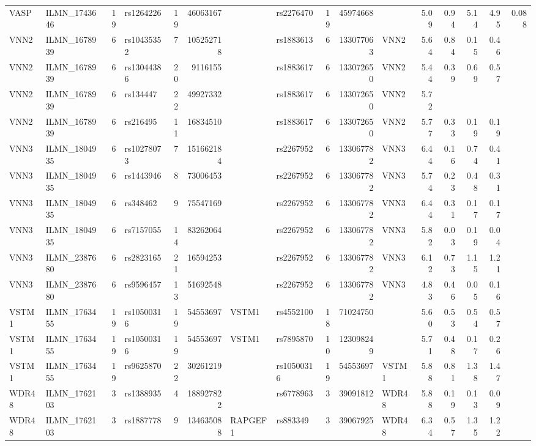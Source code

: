 \documentclass{article}
\begin{document}
\begin{landscape}
{\begin{ThreePartTable}
\begin{longtable}{|llr|lrrl|lrrl|rrrr|r|}
  VASP & ILMN\_1743646 & 19 & rs1264226 & 19 & 46063167 &  & rs2276470 & 19 & 45974668 &  & 5.09 & 0.94 & 5.14 & 4.95 & 0.088 \\
  VNN2 & ILMN\_1678939 & 6 & rs10435352 & 7 & 105252718 &  & rs1883613 & 6 & 133077063 & VNN2 & 5.64 & 0.84 & 0.15 & 0.46 &  \\
  VNN2 & ILMN\_1678939 & 6 & rs13044386 & 20 & 9116155 &  & rs1883617 & 6 & 133072650 & VNN2 & 5.44 & 0.39 & 0.69 & 0.57 &  \\
  VNN2 & ILMN\_1678939 & 6 & rs134447 & 22 & 49927332 &  & rs1883617 & 6 & 133072650 & VNN2 & 5.72 &  &  &  &  \\
  VNN2 & ILMN\_1678939 & 6 & rs216495 & 11 & 16834510 &  & rs1883617 & 6 & 133072650 & VNN2 & 5.77 & 0.33 & 0.19 & 0.19 &  \\
  VNN3 & ILMN\_1804935 & 6 & rs10278073 & 7 & 151662184 &  & rs2267952 & 6 & 133067782 & VNN3 & 6.44 & 0.16 & 0.74 & 0.41 &  \\
  VNN3 & ILMN\_1804935 & 6 & rs1443946 & 8 & 73006453 &  & rs2267952 & 6 & 133067782 & VNN3 & 5.74 & 0.23 & 0.48 & 0.31 &  \\
  VNN3 & ILMN\_1804935 & 6 & rs348462 & 9 & 75547169 &  & rs2267952 & 6 & 133067782 & VNN3 & 6.44 & 0.31 & 0.17 & 0.17 &  \\
  VNN3 & ILMN\_1804935 & 6 & rs7157055 & 14 & 83262064 &  & rs2267952 & 6 & 133067782 & VNN3 & 5.82 & 0.03 & 0.19 & 0.04 &  \\
  VNN3 & ILMN\_2387680 & 6 & rs2823165 & 21 & 16594253 &  & rs2267952 & 6 & 133067782 & VNN3 & 6.12 & 0.73 & 1.15 & 1.21 &  \\
  VNN3 & ILMN\_2387680 & 6 & rs9596457 & 13 & 51692548 &  & rs2267952 & 6 & 133067782 & VNN3 & 4.83 & 0.46 & 0.05 & 0.16 &  \\
  VSTM1 & ILMN\_1763455 & 19 & rs10500316 & 19 & 54553697 & VSTM1 & rs4552100 & 18 & 71024750 &  & 5.60 & 0.53 & 0.54 & 0.57 &  \\
  VSTM1 & ILMN\_1763455 & 19 & rs10500316 & 19 & 54553697 & VSTM1 & rs7895870 & 10 & 123098249 &  & 5.71 & 0.48 & 0.17 & 0.26 &  \\
  VSTM1 & ILMN\_1763455 & 19 & rs9625870 & 22 & 30261219 &  & rs10500316 & 19 & 54553697 & VSTM1 & 5.88 & 0.81 & 1.38 & 1.47 &  \\
  WDR48 & ILMN\_1762103 & 3 & rs1388935 & 4 & 188927822 &  & rs6778963 & 3 & 39091812 & WDR48 & 5.88 & 0.19 & 0.13 & 0.09 &  \\
  WDR48 & ILMN\_1762103 & 3 & rs1887778 & 9 & 134635088 & RAPGEF1 & rs883349 & 3 & 39067925 & WDR48 & 6.34 & 0.57 & 1.35 & 1.22 &  \\

\end{longtable}
\end{ThreePartTable}}
\end{landscape}
\end{document}
